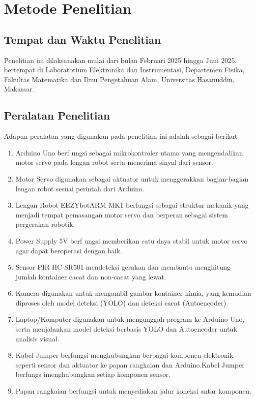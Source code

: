 \chapter{Metode Penelitian}
\section{Tempat dan Waktu Penelitian}
Penelitian ini dilaksanakan mulai dari bulan Februari 2025 hingga Juni
2025, bertempat di Laboratorium Elektronika dan Instrumentasi,
Departemen Fisika, Fakultas Matematika dan Ilmu Pengetahuan Alam,
Universitas Hasanuddin, Makassar.

\vspace{1em}

\section{Peralatan Penelitian}
Adapun peralatan yang digunakan pada penelitian ini adalah sebagai berikut
\begin{enumerate}
  \item Arduino Uno berf ungsi sebagai mikrokontroler utama yang
    mengendalikan motor servo pada lengan robot serta menerima sinyal
    dari sensor.
  \item Motor Servo digunakan sebagai aktuator untuk menggerakkan
    bagian-bagian lengan robot sesuai perintah dari Arduino.
  \item Lengan Robot EEZYbotARM MK1 berfungsi sebagai struktur
    mekanik yang menjadi tempat pemasangan motor servo dan berperan
    sebagai sistem pergerakan robotik.
  \item Power Supply 5V berf ungsi memberikan catu daya stabil untuk
    motor servo agar dapat beroperasi dengan baik.
  \item Sensor PIR HC-SR501 mendeteksi gerakan dan membantu
    menghitung jumlah kontainer cacat dan non-cacat yang lewat.
  \item Kamera digunakan untuk mengambil gambar kontainer kimia, yang
    kemudian diproses oleh model deteksi (YOLO) dan deteksi cacat (Autoencoder).
  \item Laptop/Komputer digunakan untuk mengunggah program ke Arduino
    Uno, serta menjalankan model deteksi berbasis YOLO dan
    Autoencoder untuk analisis visual.
  \item Kabel Jumper berfungsi menghubungkan berbagai komponen
    elektronik seperti sensor dan aktuator ke papan rangkaian dan
    Arduino.Kabel Jumper berfungs imenghubungkan setiap komponen sensor.
  \item Papan rangkaian berfungsi untuk menyediakan jalur koneksi
    antar komponen.
\end{enumerate}

